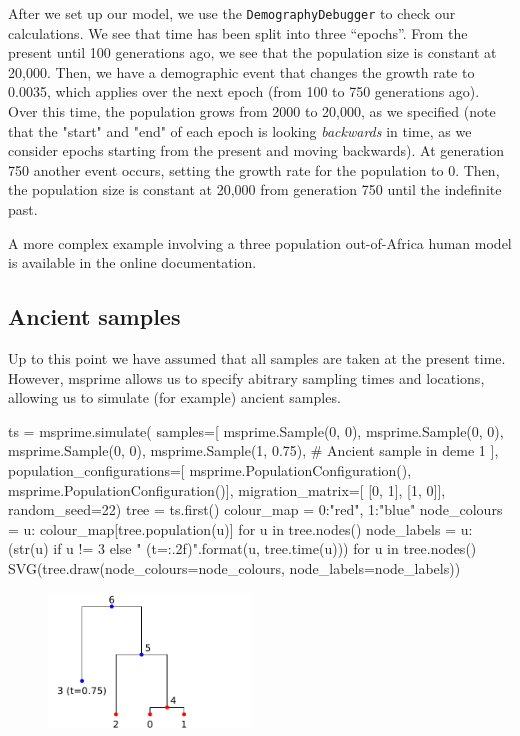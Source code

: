 \documentclass[graybox]{svmult}
\newcommand{\includenbimage}[1]{\begin{center}\texttt{[image: \#1]}\end{center}}
\begin{document}
    After we set up our model, we use the \texttt{DemographyDebugger} to
check our calculations. We see that time has been split into three
``epochs''. From the present until 100 generations ago, we see that the
population size is constant at 20,000. Then, we have a demographic event
that changes the growth rate to 0.0035, which applies over the next
epoch (from 100 to 750 generations ago). Over this time, the population
grows from 2000 to 20,000, as we specified (note that the "start" and
"end" of each epoch is looking \emph{backwards} in time, as we consider
epochs starting from the present and moving backwards). At generation
750 another event occurs, setting the growth rate for the population to
0. Then, the population size is constant at 20,000 from generation 750
until the indefinite past.

A more complex example involving a three population out-of-Africa human
model is available in the online documentation.

\subsection{Ancient samples}\label{ancient-samples}

Up to this point we have assumed that all samples are taken at the
present time. However, msprime allows us to specify abitrary sampling
times and locations, allowing us to simulate (for example) ancient
samples.

\begin{pythoncode}
ts = msprime.simulate(
    samples=[
        msprime.Sample(0, 0), msprime.Sample(0, 0), msprime.Sample(0, 0),
        msprime.Sample(1, 0.75), # Ancient sample in deme 1
    ],
    population_configurations=[
        msprime.PopulationConfiguration(),
        msprime.PopulationConfiguration()],
    migration_matrix=[
        [0, 1],
        [1, 0]],
    random_seed=22)
tree = ts.first()
colour_map = {0:"red", 1:"blue"}
node_colours = {u: colour_map[tree.population(u)] for u in tree.nodes()}
node_labels = {
    u: (str(u) if u != 3 else "{} (t={:.2f})".format(u, tree.time(u)))
    for u in tree.nodes()}
SVG(tree.draw(node_colours=node_colours, node_labels=node_labels))
\end{pythoncode}

\begin{figure}
  \begin{center}
    \includegraphics[width=0.48\textwidth]{images/simulations_45_0.pdf}
  \end{center}
\end{figure}
\end{document}
